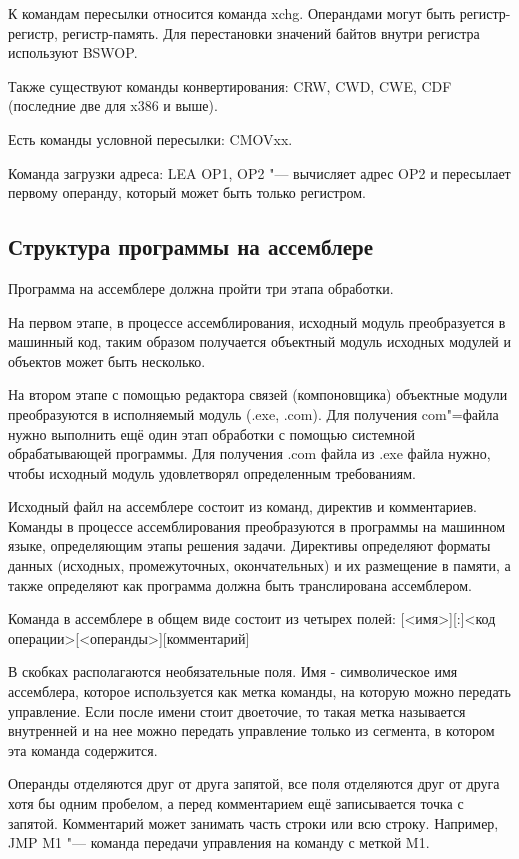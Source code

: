К командам пересылки относится команда xchg. Операндами могут быть регистр-регистр, регистр-память.
Для перестановки значений байтов внутри регистра используют BSWOP.

Также существуют команды конвертирования: CRW, CWD, CWE, CDF (последние две для x386 и выше).

Есть команды условной пересылки: CMOVxx.

Команда загрузки адреса: LEA OP1, OP2 "--- вычисляет адрес OP2 и пересылает первому операнду,
который может быть только регистром.

\subsection{Структура программы на ассемблере}

Программа на ассемблере должна пройти три этапа обработки.

На первом этапе, в процессе ассемблирования, исходный модуль преобразуется в машинный
код, таким образом получается объектный модуль исходных модулей и объектов может быть
несколько.

На втором этапе с помощью редактора связей (компоновщика) объектные модули преобразуются
в исполняемый модуль (.exe, .com). Для получения com"=файла нужно выполнить ещё один
этап обработки с помощью системной обрабатывающей программы. Для получения .com файла
из .exe файла нужно, чтобы исходный модуль удовлетворял определенным требованиям.

Исходный файл на ассемблере состоит из команд, директив и комментариев. Команды
в процессе ассемблирования преобразуются в программы на машинном языке, определяющим
этапы решения задачи. Директивы определяют форматы данных (исходных, промежуточных, окончательных)
и их размещение в памяти, а также определяют как программа должна быть транслирована ассемблером.

Команда в ассемблере в общем виде состоит из четырех полей:
[<имя>][:]<код операции>[<операнды>][комментарий]

В скобках располагаются необязательные поля. Имя - символическое имя ассемблера, которое
используется как метка команды, на которую можно передать управление. Если после
имени стоит двоеточие, то такая метка называется внутренней и на нее можно передать
управление только из сегмента, в котором эта команда содержится.

Операнды отделяются друг от друга запятой, все поля отделяются друг от друга хотя бы
одним пробелом, а перед комментарием ещё записывается точка с запятой. Комментарий
может занимать часть строки или всю строку.
Например, JMP M1 "--- команда передачи управления на команду с меткой M1.

